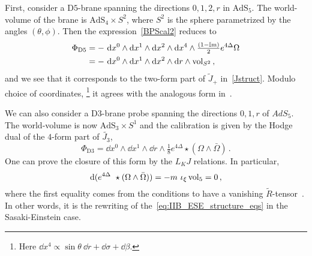 \documentclass[debug]{phd}
\begin{document}
First, consider a D$5$-brane spanning the directions $0,1,2, r$ in $\mathrm{AdS}_5$. 
The world-volume of the brane is $\mathrm{AdS}_4 \times S^2$, where $S^2$ is the sphere parametrized by the angles $(\theta, \phi)$. 
Then the expression~\eqref{BPScal2} reduces to 
%
	\begin{equation} 
		\begin{split}
			\Phi_{\mathrm{D}5} &= -\ \mathrm{d}  x^0 \wedge \mathrm{d}  x^1 \wedge \mathrm{d}  x^2 \wedge \mathrm{d}  x^4 \wedge \tfrac{(1-\operatorname{\mathbb{I}m})}{2} e^{4\Delta}\Omega \\
				& = -\ \mathrm{d}  x^0 \wedge \mathrm{d}  x^1 \wedge \mathrm{d}  x^2 \wedge \mathrm{d}  r \wedge \operatorname{vol}_{S^2}\, ,
		\end{split}
	\end{equation} 
%
and we see that it corresponds to the two-form part of $\tilde{J}_+$ in~\eqref{Jstruct}.
Modulo choice of coordinates,%
		\footnote{%
		Here $\dd  x^4 \propto \sin \theta\ \dd  r + \dd  \sigma + \dd  \beta$.%
		} it agrees with the analogous form in~\cite{Cascales:2004qp}.

We can also consider a D$3$-brane probe spanning the directions $0,1,r $ of $AdS_5$. 
The world-volume is now $\mathrm{AdS}_3 \times S^1$ and the calibration is given by the Hodge dual of the $4$-form part of $\tilde{J_3}$,
%
	\begin{equation} 
		\Phi_{\mathrm{D}3} = \dd  x^0 \wedge \dd  x^1 \wedge \dd  r \wedge \tfrac{1}{8} e^{4\Delta} \star( \Omega \wedge \bar{\Omega})\, .
	\end{equation} 
%
One can prove the closure of this form by the $L_K J$ relations. In particular,
%
	\begin{equation} 
		\dd  (e^{4\Delta} \star ( \Omega \wedge \bar{\Omega})) = - m\ \iota_\xi \vol_5 = 0\, ,
	\end{equation} 
%
where the first equality comes from the conditions to have a vanishing $\tilde{R}$-tensor~\cite{AshmoreECY,AshmoreESE}. 
In other words, it is the rewriting of the~\eqref{eq:IIB_ESE_structure_eqs} in the Sasaki-Einstein case.


\end{document}
